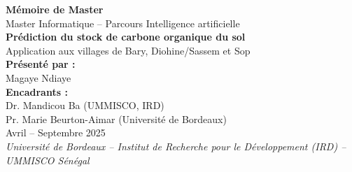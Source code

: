 \documentclass[12pt,a4paper,oneside]{report}
\begin{document}
\begin{titlepage}
\begin{center}
\vspace{2cm}

{\Large \textbf{Mémoire de Master}} \\[0.5cm]
{\large Master Informatique – Parcours Intelligence artificielle}\\[1.2cm]

{\Huge \textbf{Prédiction du stock de carbone organique du sol}}\\[0.3cm]
{\Large Application aux villages de Bary, Diohine/Sassem et Sop}\\[2cm]

\textbf{Présenté par :} \\
{\large Magaye Ndiaye}\\[1cm]

\textbf{Encadrants :} \\
Dr. Mandicou Ba (UMMISCO, IRD) \\
Pr. Marie Beurton-Aimar (Université de Bordeaux) \\[2cm]

{\large Avril – Septembre 2025}\\[3cm]

\textit{Université de Bordeaux – Institut de Recherche pour le Développement (IRD) – UMMISCO Sénégal}

\end{center}
\end{titlepage}
\end{document}
